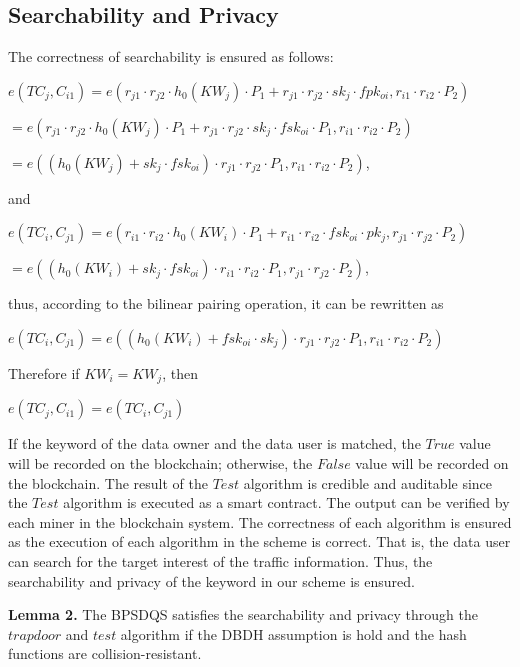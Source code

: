 \documentclass[journal,10pt]{IEEEtran}
\begin{document}
\subsection{Searchability and Privacy}

The correctness of searchability is ensured as follows:

\begin{center}
$e(TC_j, C_{i1}) = e(r_{j1} \cdot r_{j2} \cdot h_0(KW_j) \cdot P_1 + r_{j1} \cdot r_{j2} \cdot sk_j \cdot fpk_{oi}, r_{i1} \cdot r_{i2} \cdot P_2)$
    
$= e(r_{j1} \cdot r_{j2} \cdot h_0(KW_j) \cdot P_1 + r_{j1} \cdot r_{j2} \cdot sk_j \cdot fsk_{oi} \cdot P_1, r_{i1} \cdot r_{i2} \cdot P_2)$
    
$= e((h_0(KW_j) + sk_j \cdot fsk_{oi}) \cdot r_{j1} \cdot r_{j2} \cdot P_1, r_{i1} \cdot r_{i2} \cdot P_2)$,
\end{center}
and
\begin{center}
$e(TC_i, C_{j1}) = e(r_{i1} \cdot r_{i2} \cdot h_0(KW_i) \cdot P_1 + r_{i1} \cdot r_{i2} \cdot fsk_{oi} \cdot pk_j, r_{j1} \cdot r_{j2} \cdot P_2)$

$= e((h_0(KW_i) + sk_j \cdot fsk_{oi}) \cdot r_{i1} \cdot r_{i2} \cdot P_1, r_{j1} \cdot r_{j2} \cdot P_2)$,
\end{center}
thus, according to the bilinear pairing operation, it can be rewritten as
\begin{center}
$e(TC_i, C_{j1})= e((h_0(KW_i) + fsk_{oi} \cdot sk_j) \cdot r_{j1} \cdot r_{j2} \cdot P_1, r_{i1} \cdot r_{i2} \cdot P_2)$
\end{center}
Therefore if $KW_i = KW_j$, then
\begin{center}
$e(TC_j, C_{i1}) = e(TC_i, C_{j1})$
\end{center}


If the keyword of the data owner and the data user is matched, the $True$ value will be recorded on the blockchain; otherwise, the $False$ value will be recorded on the blockchain. The result of the $Test$ algorithm is credible and auditable since the $Test$ algorithm is executed as a smart contract. The output can be verified by each miner in the blockchain system. The correctness of each algorithm is ensured as the execution of each algorithm in the scheme is correct. That is, the data user can search for the target interest of the traffic information. Thus, the searchability and privacy of the keyword in our scheme is ensured.

\textbf{Lemma 2.}
The BPSDQS satisfies the searchability and privacy through the $trapdoor$ and $test$ algorithm if the DBDH assumption is hold and the hash functions are collision-resistant.
\end{document}
